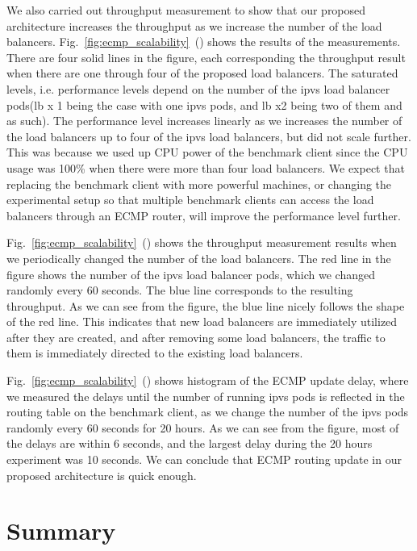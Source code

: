 We also carried out throughput measurement to show that our proposed architecture increases the throughput as we increase the number of the load balancers.
Fig.~\ref{fig:ecmp_scalability}~() shows the results of the measurements.
There are four solid lines in the figure, each corresponding the throughput result when there are one through four of the proposed load balancers.
The saturated levels, i.e. performance levels depend on the number of the ipvs load balancer pods(lb x 1 being the case with one ipvs pods, and lb x2 being two of them and as such). The performance level increases linearly as we increases the number of the load balancers up to four of the ipvs load balancers, but did not scale further.
This was because we used up CPU power of the benchmark client since the CPU usage was 100\% when there were more than four load balancers.
We expect that replacing the benchmark client with more powerful machines, or changing the experimental setup so that multiple benchmark clients can access the load balancers through an ECMP router, will improve the performance level further.

Fig.~\ref{fig:ecmp_scalability}~() shows the throughput measurement results when we periodically changed the number of the load balancers. 
The red line in the figure shows the number of the ipvs load balancer pods, which we changed randomly every 60 seconds.
The blue line corresponds to the resulting throughput.
As we can see from the figure, the blue line nicely follows the shape of the red line.
This indicates that new load balancers are immediately utilized after they are created, and after removing some load balancers, the traffic to them is immediately directed to the existing load balancers.

Fig.~\ref{fig:ecmp_scalability}~() shows histogram of the ECMP update delay, where we measured the delays until the number of running ipvs pods is reflected in the routing table on the benchmark client, as we change the number of the ipvs pods randomly every 60 seconds for 20 hours.
As we can see from the figure, most of the delays are within 6 seconds, and the largest delay during the 20 hours experiment was 10 seconds.
We can conclude that ECMP routing update in our proposed architecture is quick enough.

\FloatBarrier

\section{Summary}\label{Conclusions}

